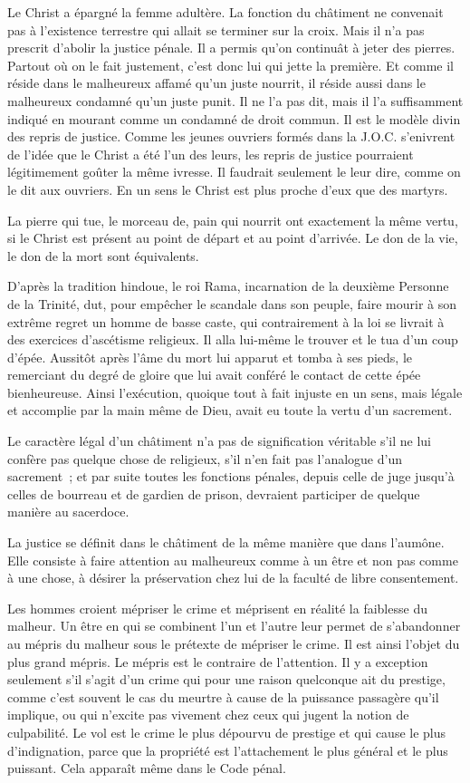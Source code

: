 \documentclass[french,twoside]{book} %
\begin{document}
Le Christ a épargné la femme adultère. La fonction du châtiment ne convenait pas à l'existence terrestre qui allait se terminer sur la croix. Mais il n'a pas prescrit d'abolir la justice pénale. Il a permis qu'on continuât à jeter des pierres. Partout où on le fait justement, c'est donc lui qui jette la première. Et comme il réside dans le malheureux affamé qu'un juste nourrit, il réside aussi dans le malheureux condamné qu'un juste punit. Il ne l'a pas dit, mais il l'a suffisamment indiqué en mourant comme un condamné de droit commun. Il est le modèle divin des repris de justice. Comme les jeunes ouvriers formés dans la J.O.C. s'enivrent de l'idée que le Christ a été l'un des leurs, les repris de justice pourraient légitimement goûter la même ivresse. Il faudrait seulement le leur dire, comme on le dit aux ouvriers. En un sens le Christ est plus proche d'eux que des martyrs.\par
La pierre qui tue, le morceau de, pain qui nourrit ont exactement la même vertu, si le Christ est présent au point de départ et au point d'arrivée. Le don de la vie, le don de la mort sont équivalents.\par
D'après la tradition hindoue, le roi Rama, incarnation de la deuxième Personne de la Trinité, dut, pour empêcher le scandale dans son peuple, faire mourir à son extrême regret un homme de basse caste, qui contrairement à la loi se livrait à des exercices d'ascétisme religieux. Il alla lui-même le trouver et le tua d'un coup d'épée. Aussitôt après l'âme du mort lui apparut et tomba à ses pieds, le remerciant du degré de gloire que lui avait conféré le contact de cette épée bienheureuse. Ainsi l'exécution, quoique tout à fait injuste en un sens, mais légale et accomplie par la main même de Dieu, avait eu toute la vertu d'un sacrement.\par
Le caractère légal d'un châtiment n'a pas de signification véritable s'il ne lui confère pas quelque chose de religieux, s'il n'en fait pas l'analogue d'un sacrement ; et par suite toutes les fonctions pénales, depuis celle de juge jusqu'à celles de bourreau et de gardien de prison, devraient participer de quelque manière au sacerdoce.\par
La justice se définit dans le châtiment de la même manière que dans l'aumône. Elle consiste à faire attention au malheureux comme à un être et non pas comme à une chose, à désirer la préservation chez lui de la faculté de libre consentement.\par
Les hommes croient mépriser le crime et méprisent en réalité la faiblesse du malheur. Un être en qui se combinent l'un et l'autre leur permet de s'abandonner au mépris du malheur sous le prétexte de mépriser le crime. Il est ainsi l'objet du plus grand mépris. Le mépris est le contraire de l'attention. Il y a exception seulement s'il s'agit d'un crime qui pour une raison quelconque ait du prestige, comme c'est souvent le cas du meurtre à cause de la puissance passagère qu'il implique, ou qui n'excite pas vivement chez ceux qui jugent la notion de culpabilité. Le vol est le crime le plus dépourvu de prestige et qui cause le plus d'indignation, parce que la propriété est l'attachement le plus général et le plus puissant. Cela apparaît même dans le Code pénal.\par
\end{document}
